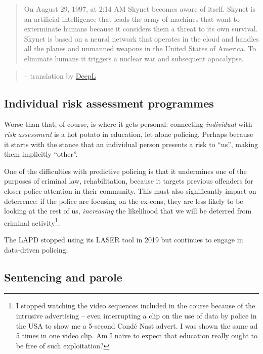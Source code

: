 \documentclass[
]{book}
\begin{document}
\begin{quote}
On August 29, 1997, at 2:14 AM Skynet becomes aware of itself. Skynet is an artificial intelligence that leads the army of machines that want to exterminate humans because it considers them a threat to its own survival. Skynet is based on a neural network that operates in the cloud and handles all the planes and unmanned weapons in the United States of America. To eliminate humans it triggers a nuclear war and subsequent apocalypse.
\end{quote}

\begin{quote}
-- translation by \href{https://www.deepl.com/}{DeepL}
\end{quote}

\hypertarget{individual-risk-assessment-programmes}{%
\subsection{Individual risk assessment programmes}\label{individual-risk-assessment-programmes}}

Worse than that, of course, is where it gets personal: connecting \emph{individual} with \emph{risk assessment} is a hot potato in education, let alone policing. Perhaps because it starts with the stance that an individual person presents a risk to ``us'', making them implicitly ``other''.

One of the difficulties with predictive policing is that it undermines one of the purposes of criminal law, rehabilitation, because it targets previous offenders for closer police attention in their community. This must also significantly impact on deterrence: if the police are focusing on the ex-cons, they are less likely to be looking at the rest of us, \emph{increasing} the likelihood that we will be deterred from criminal activity\footnote{I stopped watching the video sequences included in the course because of the intrusive advertising -- even interrupting a clip on the use of data by police in the USA to show me a 5-second Condé Nast advert. I was shown the same ad 5 times in one video clip. Am I naïve to expect that education really ought to be free of such exploitation?}.

The LAPD stopped using its LASER tool in 2019 but continues to engage in data-driven policing.

\hypertarget{sentencing-and-parole}{%
\subsection{Sentencing and parole}\label{sentencing-and-parole}}
\end{document}
